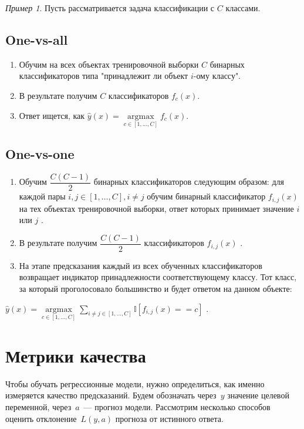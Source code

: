 \documentclass[a4paper, 12pt]{article}
\theoremstyle{plain} %
\theoremstyle{definition} %
\theoremstyle{remark} %
\newtheorem{example}{Пример}
\begin{document}
\begin{example}
Пусть рассматривается задача классификации с $ C $
 классами.

\subsection{One-vs-all}

\begin{enumerate}
	\item Обучим на всех объектах тренировочной выборки $ C $ бинарных классификаторов типа "принадлежит ли объект $ i $-ому классу".
	\item В результате получим $ C $ классификаторов $ f_c(x) $.
	\item Ответ ищется, как $ \hat y(x) = \underset{c \in [1, \dots, C] }{\operatorname{argmax}} f_c(x) $.
\end{enumerate}

\subsection{One-vs-one}

\begin{enumerate}
	\item Обучим $ \dfrac{C(C - 1)}{2} $
 бинарных классификаторов следующим образом: для каждой пары $ i, j \in [1, \dots, C], i \ne j $
 обучим бинарный классификатор $ f_{i, j}(x) $
 на тех объектах тренировочной выборки, ответ которых принимает значение $ i $
 или $ j $
.
	\item В результате получим $ \dfrac{C(C - 1)}{2} $
 классификаторов $ f_{i, j}(x) $
.
	\item На этапе предсказания каждый из всех обученных классификаторов возвращает индикатор принадлежности соответствующему классу. Тот класс, за который проголосовало большинство и будет ответом на данном объекте:
\end{enumerate}

$ \hat y(x) = \underset{c \in [1, \dots, C] }{\operatorname{argmax}} \sum \limits_{i \ne j \in [1, \dots, C]} \mathbb I [f_{i, j}(x) == c] $
.

\section{Метрики качества}

Чтобы обучать регрессионные модели, нужно определиться, как именно измеряется качество предсказаний.
Будем обозначать через~$y$ значение целевой переменной, через~$a$~--- прогноз модели.
Рассмотрим несколько способов оценить отклонение~$L(y, a)$ прогноза от истинного ответа.


\end{example}
\end{document}
